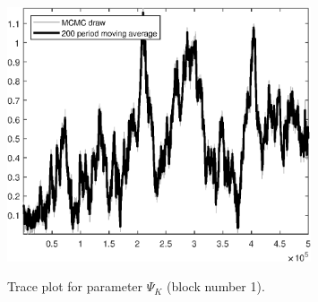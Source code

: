 \begin{figure}[H]
\centering
  \includegraphics[width=0.8\textwidth]{BRS_growth_ext_shopping/graphs/TracePlot_Psi_K_blck_1}\\
    \caption{Trace plot for parameter ${\Psi_K}$ (block number 1).}
\end{figure}
